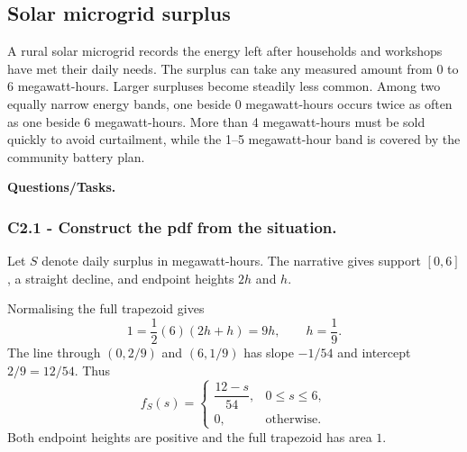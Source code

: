 \subsection{Solar microgrid surplus}\label{sec:c2-linear-microgrid}
A rural solar microgrid records the energy left after households and workshops
have met their daily needs.  The surplus can take any measured amount from 0
to 6 megawatt-hours.  Larger surpluses become steadily less common.  Among two
equally narrow energy bands, one beside 0 megawatt-hours occurs twice as often
as one beside 6 megawatt-hours.  More than 4 megawatt-hours must be sold quickly
to avoid curtailment, while the 1--5 megawatt-hour band is covered by the
community battery plan.

\begingroup{}
\endgroup

\textbf{Questions/Tasks.}
\begin{enumerate}
\end{enumerate}

\subsubsection*{C2.1 - Construct the pdf from the situation.}
\label{subsec:c2-linear-microgrid-a}
Let $S$ denote daily surplus in megawatt-hours.  The narrative gives support
$[0,6]$, a straight decline, and endpoint heights $2h$ and $h$.

Normalising
the full trapezoid gives
\[
 1=\frac12(6)(2h+h)=9h,\qquad h=\frac19.
\]
The line through $(0,2/9)$ and $(6,1/9)$ has slope $-1/54$ and intercept
$2/9=12/54$.  Thus
\[
 f_S(s)=\begin{cases}\dfrac{12-s}{54},&0\le s\le6,\\[2mm]0,&\text{otherwise.}\end{cases}
\]
Both endpoint heights are positive and the full trapezoid has area $1$.

